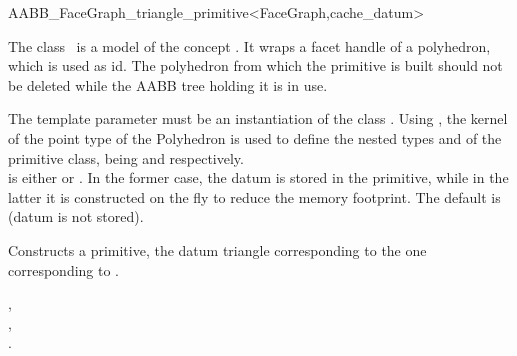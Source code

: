 \ccRefPageBegin

\begin{ccRefClass}{AABB_FaceGraph_triangle_primitive<FaceGraph,cache_datum>}

\ccDefinition
  
The class \ccRefName\ is a model of the concept . It wraps a facet handle of a polyhedron, which is used as id.
The polyhedron from which the primitive is built should not be deleted while the AABB tree holding it is in use.

\ccParameters
The template parameter  must be an instantiation of the class .
Using , the kernel  of the point type of the Polyhedron is used
to define the nested types  and  of the primitive class, being  and  respectively.\\
 is either  or . In the former case, the datum is stored in the primitive, while in the latter it is constructed on the fly to reduce
the memory footprint. The default is  (datum is not stored).


\ccCreation
{}

{Constructs a primitive, the datum triangle corresponding to the one corresponding to .}


\ccSeeAlso

,\\
,\\
.\\

\end{ccRefClass}

\ccRefPageEnd



